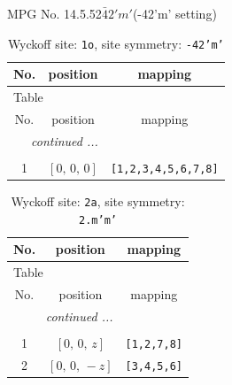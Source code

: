 \documentclass[fleqn,8pt]{jsarticle}
\begin{document}
\setcounter{MaxMatrixCols}{32}

\renewcommand{\tablename}{Table~}
\renewcommand{\figurename}{Figure~}
\begin{center}
\LARGE
MPG No. 14.5.52\quad$\bar{4}2'm'$\quad(-42'm' setting)
\end{center}
\renewcommand{\arraystretch}{1.2}
\begin{longtable}{ccc}
\caption{Wyckoff site: {\tt 1o}, site symmetry: {\tt -42'm'}}
 \\
 \hline \hline
No. & position & mapping \\ \hline \endfirsthead

\multicolumn{2}{l}{\tablename\ \thetable{}} \\
 \hline \hline
No. & position & mapping \\ \hline \endhead

 \hline \hline
\multicolumn{2}{r}{\footnotesize\it continued ...} \\ \endfoot

 \hline \hline
\multicolumn{2}{r}{} \\ \endlastfoot

1 & $\left[ 0,\, 0,\, 0 \right]$ & {\tt [1,2,3,4,5,6,7,8]} \\
\end{longtable}
\renewcommand{\arraystretch}{1.2}
\begin{longtable}{ccc}
\caption{Wyckoff site: {\tt 2a}, site symmetry: {\tt 2.m'm'}}
 \\
 \hline \hline
No. & position & mapping \\ \hline \endfirsthead

\multicolumn{2}{l}{\tablename\ \thetable{}} \\
 \hline \hline
No. & position & mapping \\ \hline \endhead

 \hline \hline
\multicolumn{2}{r}{\footnotesize\it continued ...} \\ \endfoot

 \hline \hline
\multicolumn{2}{r}{} \\ \endlastfoot

1 & $\left[ 0,\, 0,\, z \right]$ & {\tt [1,2,7,8]} \\ \hline
2 & $\left[ 0,\, 0,\, - z \right]$ & {\tt [3,4,5,6]} \\
\end{longtable}
\renewcommand{\arraystretch}{1.2}
\end{document}
